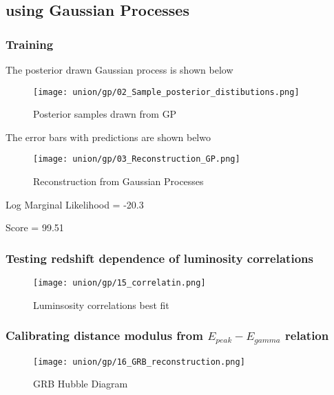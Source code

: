 \subsection{using Gaussian Processes}
\subsubsection{Training}
The posterior drawn Gaussian process is shown below

\begin{figure}[h]
	\centering
	\texttt{[image: union/gp/02\_Sample\_posterior\_distibutions.png]}
	\caption{Posterior samples drawn from GP}
	\label{fig:posterior_union}
\end{figure}

The error bars with predictions are shown belwo
\begin{figure}[h]
	\centering
	\texttt{[image: union/gp/03\_Reconstruction\_GP.png]}
	\caption{Reconstruction from Gaussian Processes}
	\label{fig:gp_re_union}
\end{figure}

Log Marginal Likelihood = -20.3

Score = 99.51
\subsubsection{Testing redshift dependence of luminosity correlations}
\begin{figure}[h]
	\centering
	\texttt{[image: union/gp/15\_correlatin.png]}
	\caption{Luminsosity correlations best fit}
	\label{fig:correlation_gp_union}
\end{figure}
\subsubsection{Calibrating distance modulus from $E_{peak}-E_{gamma}$ relation}
\begin{figure}[h]
	\centering
	\texttt{[image: union/gp/16\_GRB\_reconstruction.png]}
	\caption{GRB Hubble Diagram}
	\label{fig:HD_GRB_GP_union}
\end{figure}
